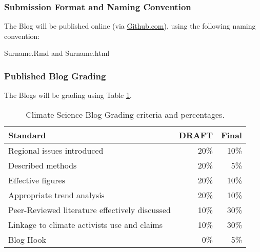 
\subsubsection{Submission Format and Naming Convention}

The Blog will be published online (via \url{Github.com}), using the following naming convention: 

\begin{center}
Surname.Rmd and Surname.html
\end{center}

\subsubsection{Published Blog Grading}

The Blogs will be grading using Table \ref{tab:bloggrading}. 

\begin{table}[h]
\caption{Climate Science Blog Grading criteria and percentages.}
\label{tab:bloggrading}
\begin{tabular}{lrr}\hline
Standard              &   DRAFT   & Final \\ \hline\hline
Regional issues introduced     & 20\%    & 10\% \\
Described methods             & 20\%    & 5\% \\
Effective figures             & 20\%    & 10\% \\
Appropriate trend analysis    & 20\%    & 10\% \\
Peer-Reviewed literature effectively discussed & 10\% & 30\%\\
Linkage to climate activists use and claims    & 10\% & 30\%\\
Blog Hook                                      & 0\%  & 5\%\\
\hline
\end{tabular}
\end{table}



